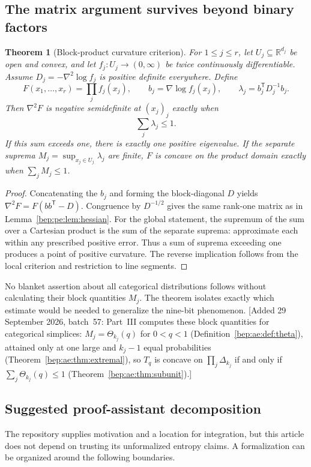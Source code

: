 \documentclass[11pt]{article}
\numberwithin{equation}{section}
\newtheorem{theorem}{Theorem}[section]
\theoremstyle{definition}
\theoremstyle{remark}
\newcommand{\R}{\mathbb R}
\begin{document}
\subsection{The matrix argument survives beyond binary factors}
\begin{theorem}[Block-product curvature criterion]\label{bep:pe:thm:blocks}
For $1\leq j\leq r$, let $U_j\subseteq\R^{d_j}$ be open and convex,
and let $f_j:U_j\to(0,\infty)$ be twice continuously differentiable.
Assume $D_j=-\nabla^2\log f_j$ is positive definite everywhere.
Define
\[
 F(x_1,\ldots,x_r)=\prod_jf_j(x_j),\qquad
 b_j=\nabla\log f_j(x_j),\qquad
 \lambda_j=b_j^{\mathsf T}D_j^{-1}b_j.
\]
Then $\nabla^2F$ is negative semidefinite at $(x_j)_j$ exactly when
\begin{equation}
 \sum_j\lambda_j\leq1.\label{bep:pe:eq:blockcriterion}
\end{equation}
If this sum exceeds one, there is exactly one positive eigenvalue.
If the separate suprema $M_j=\sup_{x_j\in U_j}\lambda_j$ are finite,
$F$ is concave on the product domain exactly when $\sum_jM_j\leq1$.
\end{theorem}
\begin{proof}
Concatenating the $b_j$ and forming the block-diagonal $D$ yields
$\nabla^2F=F(bb^{\mathsf T}-D)$. Congruence by $D^{-1/2}$ gives the
same rank-one matrix as in Lemma~\ref{bep:pe:lem:hessian}. For the global
statement, the supremum of the sum over a Cartesian product is the sum
of the separate suprema: approximate each within any prescribed
positive error. Thus a sum of suprema exceeding one produces a point
of positive curvature. The reverse implication follows from the local
criterion and restriction to line segments.
\end{proof}
No blanket assertion about all categorical distributions follows without
calculating their block quantities $M_j$. The theorem isolates exactly
which estimate would be needed to generalize the nine-bit phenomenon.
[Added 29 September 2026, batch~57: Part~III computes these block
quantities for categorical simplices: $M_j=\Theta_{k_j}(q)$ for
$0<q<1$ (Definition~\ref{bep:ae:def:theta}), attained only at one large
and $k_j-1$ equal probabilities (Theorem~\ref{bep:ae:thm:extremal}), so
$T_q$ is concave on $\prod_j\Delta_{k_j}$ if and only if
$\sum_j\Theta_{k_j}(q)\leq1$ (Theorem~\ref{bep:ae:thm:subunit}).]

\subsection{Suggested proof-assistant decomposition}
The repository supplies motivation and a location for integration, but
this article does not depend on trusting its unformalized entropy
claims. A formalization can be organized around the following boundaries.
\end{document}
